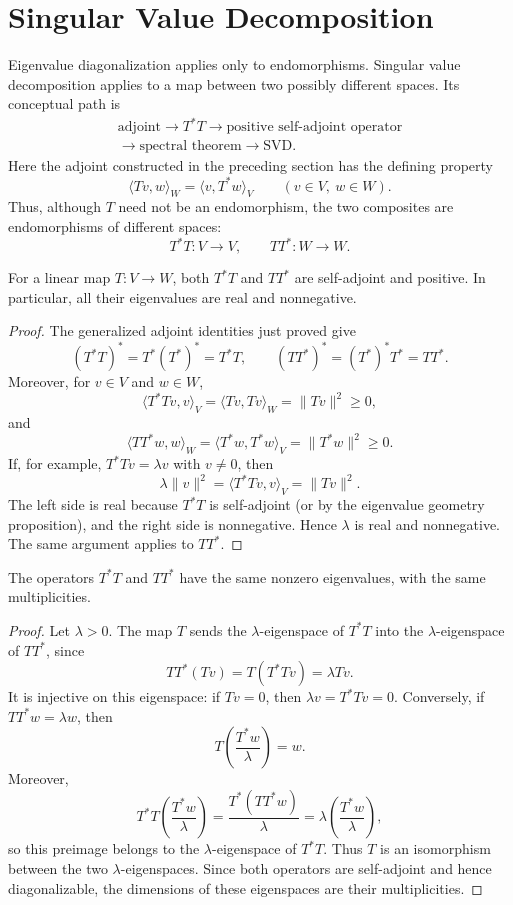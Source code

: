 \section{Singular Value Decomposition}

Eigenvalue diagonalization applies only to endomorphisms.  Singular value
decomposition applies to a map between two possibly different spaces.  Its
conceptual path is
\[
\begin{gathered}
\text{adjoint}\longrightarrow T^*T
\longrightarrow\text{positive self-adjoint operator}\\
\longrightarrow\text{spectral theorem}\longrightarrow\text{SVD}.
\end{gathered}
\]
Here the adjoint constructed in the preceding section has the defining
property
\[
\langle Tv,w\rangle_W=\langle v,T^*w\rangle_V
\qquad(v\in V,\ w\in W).
\]
Thus, although \(T\) need not be an endomorphism, the two composites are
endomorphisms of different spaces:
\[
T^*T:V\longrightarrow V,
\qquad
TT^*:W\longrightarrow W.
\]

\begin{proposition}
For a linear map \(T:V\to W\), both \(T^*T\) and \(TT^*\) are self-adjoint
and positive.  In particular, all their eigenvalues are real and
nonnegative.
\end{proposition}
\begin{proof}
The generalized adjoint identities just proved give
\[
(T^*T)^*=T^*(T^*)^*=T^*T,
\qquad
(TT^*)^*=(T^*)^*T^*=TT^*.
\]
Moreover, for \(v\in V\) and \(w\in W\),
\[
\langle T^*Tv,v\rangle_V=\langle Tv,Tv\rangle_W
=\lVert Tv\rVert^2\geq0,
\]
and
\[
\langle TT^*w,w\rangle_W=\langle T^*w,T^*w\rangle_V
=\lVert T^*w\rVert^2\geq0.
\]
If, for example, \(T^*Tv=\lambda v\) with \(v\ne0\), then
\[
\lambda\lVert v\rVert^2=\langle T^*Tv,v\rangle_V
=\lVert Tv\rVert^2.
\]
The left side is real because \(T^*T\) is self-adjoint (or by the
eigenvalue geometry proposition), and the right side is nonnegative.
Hence \(\lambda\) is real and nonnegative.  The same argument applies to
\(TT^*\).
\end{proof}

\begin{proposition}
The operators \(T^*T\) and \(TT^*\) have the same nonzero eigenvalues, with
the same multiplicities.
\end{proposition}
\begin{proof}
Let \(\lambda>0\).  The map \(T\) sends the \(\lambda\)-eigenspace of
\(T^*T\) into the \(\lambda\)-eigenspace of \(TT^*\), since
\[
TT^*(Tv)=T(T^*Tv)=\lambda Tv.
\]
It is injective on this eigenspace: if \(Tv=0\), then
\(\lambda v=T^*Tv=0\).  Conversely, if \(TT^*w=\lambda w\), then
\[
T\left(\frac{T^*w}{\lambda}\right)=w.
\]
Moreover,
\[
T^*T\left(\frac{T^*w}{\lambda}\right)
=\frac{T^*(TT^*w)}{\lambda}
=\lambda\left(\frac{T^*w}{\lambda}\right),
\]
so this preimage belongs to the \(\lambda\)-eigenspace of \(T^*T\).
Thus \(T\) is an isomorphism between the two \(\lambda\)-eigenspaces.
Since both operators are self-adjoint and hence diagonalizable, the
dimensions of these eigenspaces are their multiplicities.
\end{proof}


